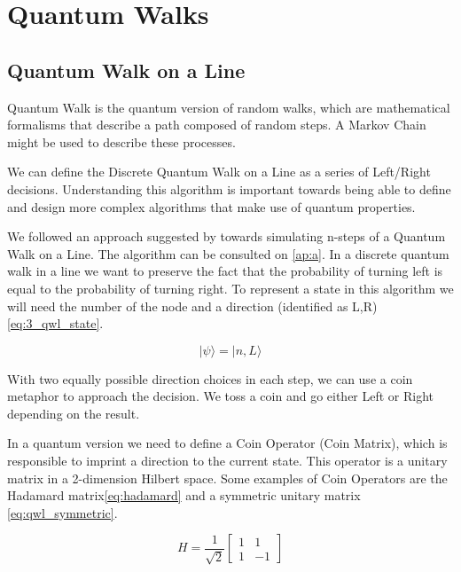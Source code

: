 \section{Quantum Walks}
\label{sec:quantum_walk}

\subsection{Quantum Walk on a Line}
\label{subsec:quantum_walk_line}

Quantum Walk is the quantum version of random walks, which are mathematical formalisms that describe a path composed of random steps. A Markov Chain might be used to describe these processes.

We can define the Discrete Quantum Walk on a Line as a series of Left/Right decisions. Understanding this algorithm is important towards being able to define and design more complex algorithms that make use of quantum properties.

 

We followed an approach suggested by \cite{Ambainis} towards simulating n-steps of a Quantum Walk on a Line. The algorithm can be consulted on \ref{ap:a}.
In a discrete quantum walk in a line we want to preserve the fact that the probability of turning left is equal to the probability of turning right.  To represent a state in this algorithm we will need the number of the node and a direction (identified as L,R) \ref{eq:3_qwl_state}.


\begin{equation}
\label{eq:3_qwl_state}
\vert \psi\rangle = \vert n, L\rangle
\end{equation}

With two equally possible direction choices in each step, we can use a coin metaphor\cite{Ambainis}\cite{Ambainis2008} to approach the decision. We toss a coin and go either Left or Right depending on the result. 

In a quantum version we need to define a Coin Operator (Coin Matrix), which is responsible to imprint a direction to the current state. This operator is a unitary matrix in a 2-dimension Hilbert space. Some examples of Coin Operators are the Hadamard matrix\ref{eq:hadamard} and a symmetric unitary matrix \ref{eq:qwl_symmetric}.

\begin{equation}
\label{eq:hadamard}
H=\frac{1}{\sqrt{2}}\left[\begin{array}{cc}
1 & 1\\
1 & -1
\end{array}\right]
\end{equation}


